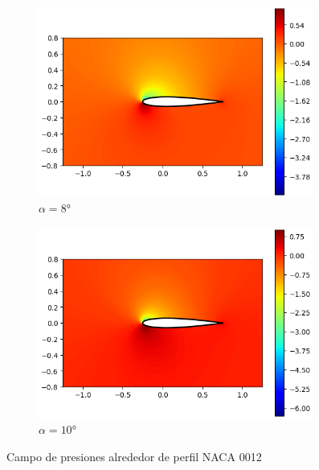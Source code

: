 \documentclass[letterpaper, openright, 12pt]{book}
\begin{document}
    \begin{figure}
        \begin{subfigure}[c]{0.48\textwidth}
            \includegraphics[keepaspectratio, width=0.99\textwidth]
                {./img/potential_flow_cp_8}
            \caption{$\alpha = 8\si{\degree}$}
            \label{fig:potential_flow_cp_8}
        \end{subfigure}
        \hfill
        \begin{subfigure}[c]{0.48\textwidth}
            \includegraphics[keepaspectratio, width=0.99\textwidth]
                {./img/potential_flow_cp_10}
            \caption{$\alpha = 10\si{\degree}$}
        \end{subfigure}
        \caption{Campo de presiones alrededor de perfil NACA 0012}
        \label{fig:potential_flow_cp__1}
    \end{figure}
\end{document}
